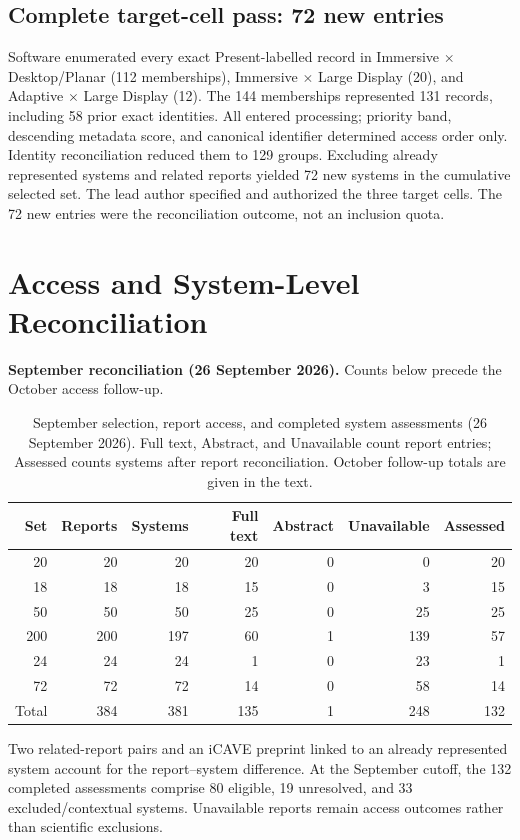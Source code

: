 \documentclass[11pt]{article}
\begin{document}
\subsection{Complete target-cell pass: 72 new entries}
Software enumerated every exact Present-labelled record in Immersive $\times$ Desktop/Planar (112 memberships), Immersive $\times$ Large Display (20), and Adaptive $\times$ Large Display (12). The 144 memberships represented 131 records, including 58 prior exact identities. All entered processing; priority band, descending metadata score, and canonical identifier determined access order only. Identity reconciliation reduced them to 129 groups. Excluding already represented systems and related reports yielded 72 new systems in the cumulative selected set. The lead author specified and authorized the three target cells. The 72 new entries were the reconciliation outcome, not an inclusion quota.

\section{Access and System-Level Reconciliation}
\noindent\textbf{September reconciliation (26 September 2026).} Counts below precede the October access follow-up.
\begin{table}[htbp]\centering\small
\caption{September selection, report access, and completed system assessments (26 September 2026). Full text, Abstract, and Unavailable count report entries; Assessed counts systems after report reconciliation. October follow-up totals are given in the text.}\label{tab:september-accounting}
\begin{tabular}{rrrrrrr}\toprule
Set & Reports & Systems & Full text & Abstract & Unavailable & Assessed\\\midrule
20&20&20&20&0&0&20\\
18&18&18&15&0&3&15\\
50&50&50&25&0&25&25\\
200&200&197&60&1&139&57\\
24&24&24&1&0&23&1\\
72&72&72&14&0&58&14\\\midrule
Total&384&381&135&1&248&132\\\bottomrule
\end{tabular}\end{table}
Two related-report pairs and an iCAVE preprint linked to an already represented system account for the report--system difference. At the September cutoff, the 132 completed assessments comprise 80 eligible, 19 unresolved, and 33 excluded/contextual systems. Unavailable reports remain access outcomes rather than scientific exclusions.
\end{document}

